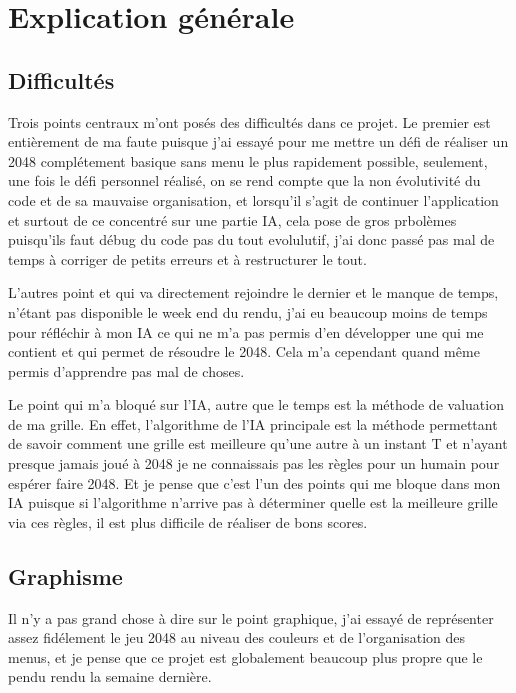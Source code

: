 \documentclass[a4paper]{article}
\date{22 Janvier 2017}
\begin{document}
\entete

\section{Explication générale}



\subsection{Difficultés}

Trois points centraux m'ont posés des difficultés dans ce projet.
Le premier est entièrement de ma faute puisque j'ai essayé pour me mettre un défi de réaliser un 2048 complétement basique sans menu le plus rapidement possible, seulement, une fois le défi personnel réalisé, on se rend compte que la non évolutivité du code et de sa mauvaise organisation, et lorsqu'il s'agit de continuer l'application et surtout de ce concentré sur une partie IA, cela pose de gros prbolèmes puisqu'ils faut débug du code pas du tout evolulutif, j'ai donc passé pas mal de temps à corriger de petits erreurs et à restructurer le tout.

L'autres point et qui va directement rejoindre le dernier et le manque de temps, n'étant pas disponible le week end du rendu, j'ai eu beaucoup moins de temps pour réfléchir à mon IA ce qui ne m'a pas permis d'en développer une qui me contient et qui permet de résoudre le 2048. Cela m'a cependant quand même permis d'apprendre pas mal de choses.

Le point qui m'a bloqué sur l'IA, autre que le temps est la méthode de valuation de ma grille. En effet, l'algorithme de l'IA principale est la méthode permettant de savoir comment une grille est meilleure qu'une autre à un instant T et n'ayant presque jamais joué à 2048 je ne connaissais pas les règles pour un humain pour espérer faire 2048. Et je pense que c'est l'un des points qui me bloque dans mon IA puisque si l'algorithme n'arrive pas à déterminer quelle est la meilleure grille via ces règles, il est plus difficile de réaliser de bons scores.

\subsection{Graphisme}

Il n'y a pas grand chose à dire sur le point graphique, j'ai essayé de représenter assez fidélement le jeu 2048 au niveau des couleurs et de l'organisation des menus, et je pense que ce projet est globalement beaucoup plus propre que le pendu rendu la semaine dernière.
\end{document}
